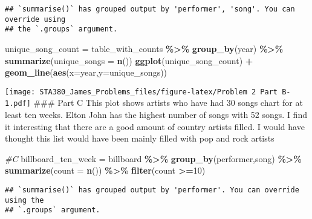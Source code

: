 \documentclass[
]{article}
\newenvironment{Shaded}{\begin{snugshade}}{\end{snugshade}}
\newcommand{\AttributeTok}[1]{\textcolor[rgb]{0.13,0.29,0.53}{#1}}
\newcommand{\CommentTok}[1]{\textcolor[rgb]{0.56,0.35,0.01}{\textit{#1}}}
\newcommand{\DecValTok}[1]{\textcolor[rgb]{0.00,0.00,0.81}{#1}}
\newcommand{\FunctionTok}[1]{\textcolor[rgb]{0.13,0.29,0.53}{\textbf{#1}}}
\newcommand{\NormalTok}[1]{#1}
\newcommand{\OtherTok}[1]{\textcolor[rgb]{0.56,0.35,0.01}{#1}}
\newcommand{\SpecialCharTok}[1]{\textcolor[rgb]{0.81,0.36,0.00}{\textbf{#1}}}
\begin{document}
\begin{verbatim}
## `summarise()` has grouped output by 'performer', 'song'. You can override using
## the `.groups` argument.
\end{verbatim}

\begin{Shaded}
\begin{Highlighting}[]
\NormalTok{unique\_song\_count }\OtherTok{=}\NormalTok{ table\_with\_counts }\SpecialCharTok{\%\textgreater{}\%} \FunctionTok{group\_by}\NormalTok{(year) }\SpecialCharTok{\%\textgreater{}\%} 
  \FunctionTok{summarize}\NormalTok{(}\AttributeTok{unique\_songs =} \FunctionTok{n}\NormalTok{())}
\FunctionTok{ggplot}\NormalTok{(unique\_song\_count) }\SpecialCharTok{+} \FunctionTok{geom\_line}\NormalTok{(}\FunctionTok{aes}\NormalTok{(}\AttributeTok{x=}\NormalTok{year,}\AttributeTok{y=}\NormalTok{unique\_songs))}
\end{Highlighting}
\end{Shaded}

\texttt{[image: STA380\_James\_Problems\_files/figure-latex/Problem 2 Part B-1.pdf]}
\#\#\# Part C This plot shows artists who have had 30 songs chart for at
least ten weeks. Elton John has the highest number of songs with 52
songs. I find it interesting that there are a good amount of country
artists filled. I would have thought this list would have been mainly
filled with pop and rock artists

\begin{Shaded}
\begin{Highlighting}[]
\CommentTok{\#C}
\NormalTok{billboard\_ten\_week }\OtherTok{=}\NormalTok{ billboard }\SpecialCharTok{\%\textgreater{}\%} \FunctionTok{group\_by}\NormalTok{(performer,song) }\SpecialCharTok{\%\textgreater{}\%} 
  \FunctionTok{summarize}\NormalTok{(}\AttributeTok{count =} \FunctionTok{n}\NormalTok{()) }\SpecialCharTok{\%\textgreater{}\%}
  \FunctionTok{filter}\NormalTok{(count }\SpecialCharTok{\textgreater{}=}\DecValTok{10}\NormalTok{)}
\end{Highlighting}
\end{Shaded}

\begin{verbatim}
## `summarise()` has grouped output by 'performer'. You can override using the
## `.groups` argument.
\end{verbatim}
\end{document}
